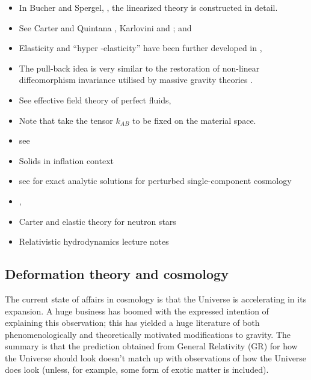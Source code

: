 \begin{itemize}
\item In Bucher and Spergel, \cite{Bucher:1998mh}, the linearized theory is constructed in detail.
\item See Carter and Quintana \cite{Carter21111972, Carter:1977qf}, Karlovini \cite{Karlovini:2002fc, Karlovini:2003xi, Karlovini:2004gq, Karlovini:2007ut} and \cite{Beig:2002pk, Frauendiener:2007yx, Brito:2009jj, Pourtsidou:2013nha}; \cite{Battye:2005ik}
\cite{Balthazar:2014oza} and \cite{Dubovsky:2011sj}
\item Elasticity and ``hyper -elasticity'' have been further developed in \cite{Carter:1982xm}, \cite{Carter:2006cw}
\item The pull-back idea is very similar to the restoration of non-linear diffeomorphism invariance utilised by massive gravity theories \cite{deRham:2014zqa}.
\item See effective field theory of perfect fluids, \cite{Ballesteros:2012kv}
\item Note that \cite{Karlovini:2002fc} take the tensor $k_{AB}$ to be fixed on the material space.
\item see \cite{Bel:1996pb} \cite{Polak:2007dm}
\item Solids in inflation context \cite{Gruzinov:2004ty, Endlich:2012pz, Bartolo:2014xfa}
\item see \cite{Skovran:2014dka} for exact analytic solutions for perturbed single-component cosmology 
\item \cite{Frauendiener:2007yx}, \cite{Kijowski:1994eq}
\item Carter and elastic theory for neutron stars \cite{Carter:2005gg}
\item Relativistic hydrodynamics lecture notes \cite{Gourgoulhon:2006bn}
\end{itemize}

\subsection{Deformation theory and cosmology}
The current state of affairs in cosmology is that the Universe is accelerating in its expansion. A huge business has boomed with the expressed intention of explaining this observation; this has yielded a huge literature of both phenomenologically and theoretically motivated modifications to gravity. The summary is that the prediction obtained from General Relativity (GR) for how the Universe should look doesn't match up with observations of how the Universe does look (unless, for example, some form of exotic matter is included). 

